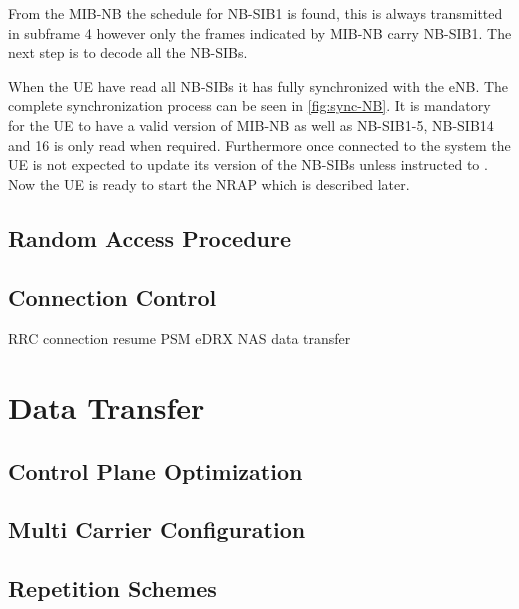 From the \gls{MIB-NB} the schedule for \gls{NB-SIB}1 is found, this is always transmitted in subframe 4 however only the frames indicated by \gls{MIB-NB} carry \gls{NB-SIB}1. The next step is to decode all the \gls{NB-SIB}s.

When the \gls{UE} have read all \gls{NB-SIB}s it has fully synchronized with the \gls{eNB}. The complete synchronization process can be seen in \autoref{fig:sync-NB}. It is mandatory for the \gls{UE} to have a valid version of \gls{MIB-NB} as well as \gls{NB-SIB}1-5, \gls{NB-SIB}14 and 16 is only read when required. Furthermore once connected to the system the \gls{UE} is not expected to update its version of the \gls{NB-SIB}s unless instructed to \citep{whitepaper}. Now the \gls{UE} is ready to start the \gls{NRAP} which is described later. 




\subsection{Random Access Procedure} \label{sec:RAP}

\subsection{Connection Control}

RRC connection resume
PSM
eDRX
NAS data transfer

\section{Data Transfer}

\subsection{Control Plane Optimization}

\subsection{Multi Carrier Configuration}

\subsection{Repetition Schemes}

